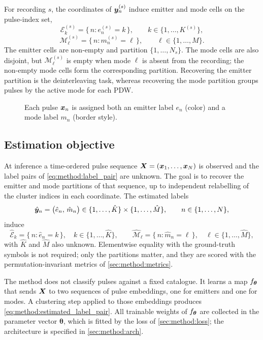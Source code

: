 For recording $s$, the coordinates of $\bm{y}^{(s)}_n$ induce emitter and mode cells on the pulse-index set,
\begin{equation}\label{eq:method:emitter_partition}
  \mathcal{E}^{(s)}_k = \{\, n : e^{(s)}_n = k \,\},
  \qquad
  k \in \{1,\ldots,K^{(s)}\},
\end{equation}
\begin{equation}\label{eq:method:mode_partition}
  \mathcal{M}^{(s)}_\ell = \{\, n : m^{(s)}_n = \ell \,\},
  \qquad
  \ell \in \{1,\ldots,M\}.
\end{equation}
The emitter cells are non-empty and partition $\{1,\ldots,N_s\}$.
The mode cells are also disjoint, but $\mathcal{M}^{(s)}_\ell$ is empty when mode $\ell$ is absent from the recording; the non-empty mode cells form the corresponding partition.
Recovering the emitter partition is the deinterleaving task, whereas recovering the mode partition groups pulses by the active mode for each PDW.

\begin{figure}[tbp]
  \centering
  
  \caption{Each pulse $\bm{x}_n$ is assigned both an emitter label $e_n$ (color) and a mode label $m_n$ (border style).}
  \label{fig:method:partitions}
\end{figure}

\subsection*{Estimation objective}

At inference a time-ordered pulse sequence $\bm{X}=(\bm{x}_1,\ldots,\bm{x}_N)$ is observed and the label pairs of \cref{eq:method:label_pair} are unknown.
The goal is to recover the emitter and mode partitions of that sequence, up to independent relabelling of the cluster indices in each coordinate.
The estimated labels
\begin{equation}\label{eq:method:estimated_label_pair}
  \hat{\bm{y}}_n = \bigl(\hat{e}_n,\, \hat{m}_n\bigr)
  \in \{1,\ldots,\hat{K}\} \times \{1,\ldots,\hat{M}\},
  \qquad n \in \{1,\ldots,N\},
\end{equation}
induce
\begin{equation}\label{eq:method:estimated_partitions}
  \widehat{\mathcal{E}}_k
  =
  \{\,n : \hat{e}_n = k\,\},
  \quad k \in \{1,\ldots,\hat{K}\},
  \qquad
  \widehat{\mathcal{M}}_\ell
  =
  \{\,n : \hat{m}_n = \ell\,\},
  \quad \ell \in \{1,\ldots,\hat{M}\},
\end{equation}
with $\hat{K}$ and $\hat{M}$ also unknown.
Elementwise equality with the ground-truth symbols is not required; only the partitions matter, and they are scored with the permutation-invariant metrics of \cref{sec:method:metrics}.

The method does not classify pulses against a fixed catalogue.
It learns a map $f_{\bm{\theta}}$ that sends $\bm{X}$ to two sequences of pulse embeddings, one for emitters and one for modes.
A clustering step applied to those embeddings produces \cref{eq:method:estimated_label_pair}.
All trainable weights of $f_{\bm{\theta}}$ are collected in the parameter vector $\bm{\theta}$, which is fitted by the loss of \cref{sec:method:loss}; the architecture is specified in \cref{sec:method:arch}.
